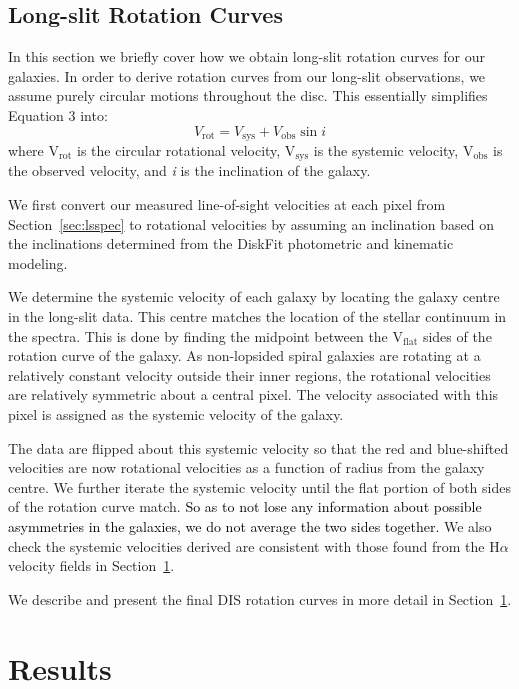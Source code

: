 \documentclass[a4paper,fleqn,usenatbib]{mnras}
\newcommand{\authorfix}{\textcolor{black}}
\begin{document}
\subsection{Long-slit Rotation Curves}
\label{sec:lsrcs}

In this section we briefly cover how we obtain long-slit rotation curves for our galaxies. In order to derive rotation curves from our long-slit observations, we assume purely circular motions throughout the disc. This essentially simplifies Equation 3 into:
\begin{equation}
V_{\mathrm{rot}} = V_{\mathrm{sys}} + V_{\mathrm{obs}}\sin{i}
\end{equation}
where V$_{\mathrm{rot}}$ is the circular rotational velocity, V$_{\mathrm{sys}}$ is the systemic velocity, V$_{\mathrm{obs}}$ is the observed velocity, and \textit{i} is the inclination of the galaxy.

We first convert our measured line-of-sight velocities at each pixel from Section~\ref{sec:lsspec} to rotational velocities by assuming an inclination based on the inclinations determined from the DiskFit photometric and kinematic modeling.

We determine the systemic velocity of each galaxy by locating the galaxy centre in the long-slit data. This centre matches the location of the stellar continuum in the spectra. This is done by finding the midpoint between the V$_{\mathrm{flat}}$ sides of the rotation curve of the galaxy. As non-lopsided spiral galaxies are rotating at a relatively constant velocity outside their inner regions, the rotational velocities are relatively symmetric about a central pixel. The velocity associated with this pixel is assigned as the systemic velocity of the galaxy.

The data are flipped about this systemic velocity so that the red and blue-shifted velocities are now rotational velocities as a function of radius from the galaxy centre. We further iterate the systemic velocity until the flat portion of both sides of the rotation curve match. \authorfix{So as to not lose any information about possible asymmetries in the galaxies, we do not average the two sides together.} We also check the systemic velocities derived are consistent with those found from the H$\alpha$ velocity fields in Section~\ref{sec:results}.

We describe and present the final DIS rotation curves in more detail in Section~\ref{sec:results}.

\section{Results}
\label{sec:results}
\end{document}
